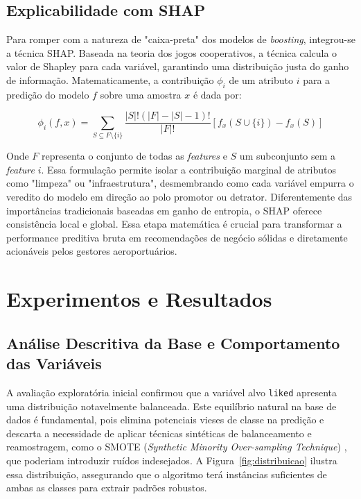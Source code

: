 \documentclass[12pt]{article}
\begin{document}
\subsection{Explicabilidade com SHAP}
Para romper com a natureza de "caixa-preta" dos modelos de \textit{boosting}, integrou-se a técnica SHAP. Baseada na teoria dos jogos cooperativos, a técnica calcula o valor de Shapley para cada variável, garantindo uma distribuição justa do ganho de informação. Matematicamente, a contribuição $\phi_i$ de um atributo $i$ para a predição do modelo $f$ sobre uma amostra $x$ é dada por:

\begin{equation}
\phi_i(f, x) = \sum_{S \subseteq F \setminus \{i\}} \frac{|S|! (|F| - |S| - 1)!}{|F|!} [f_x(S \cup \{i\}) - f_x(S)]
\end{equation}

Onde $F$ representa o conjunto de todas as \textit{features} e $S$ um subconjunto sem a \textit{feature} $i$. Essa formulação permite isolar a contribuição marginal de atributos como "limpeza" ou "infraestrutura", desmembrando como cada variável empurra o veredito do modelo em direção ao polo promotor ou detrator. Diferentemente das importâncias tradicionais baseadas em ganho de entropia, o SHAP oferece consistência local e global. Essa etapa matemática é crucial para transformar a performance preditiva bruta em recomendações de negócio sólidas e diretamente acionáveis pelos gestores aeroportuários.
\section{Experimentos e Resultados}

\subsection{Análise Descritiva da Base e Comportamento das Variáveis}
A avaliação exploratória inicial confirmou que a variável alvo \texttt{liked} apresenta uma distribuição notavelmente balanceada. Este equilíbrio natural na base de dados é fundamental, pois elimina potenciais vieses de classe na predição e descarta a necessidade de aplicar técnicas sintéticas de balanceamento e reamostragem, como o SMOTE (\textit{Synthetic Minority Over-sampling Technique}) \cite{chawla2002smote}, que poderiam introduzir ruídos indesejados. A Figura~\ref{fig:distribuicao} ilustra essa distribuição, assegurando que o algoritmo terá instâncias suficientes de ambas as classes para extrair padrões robustos.
\end{document}
